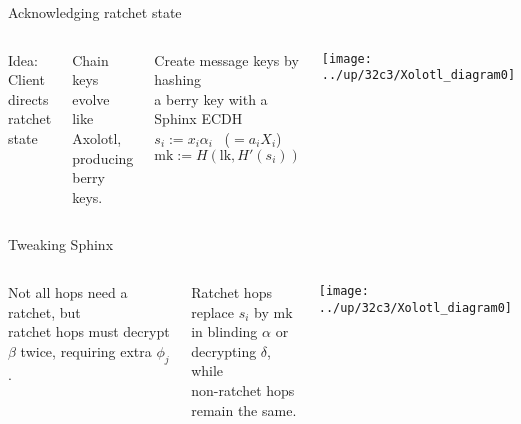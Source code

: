 \documentclass[fleqn,xcolor={usenames,dvipsnames}]{beamer}
\begin{document}
\begin{frame}[t]{Acknowledging ratchet state}
\begin{columns}[T]
Idea: Client directs ratchet state

\bigskip
Chain keys evolve like Axolotl, 
 \hspace*{2pt} producing berry keys. %

\smallskip
Create message keys by hashing \\
 \hspace*{2pt} a berry key with a Sphinx ECDH \\ %
 \hspace*{10pt} $s_i := x_i \alpha_i$ \  ($= a_i X_i$) \\
\smallskip
 \hspace*{10pt} $\textrm{mk} := H(\textrm{lk},H'(s_i))$

\medskip
{}

\texttt{[image: ../up/32c3/Xolotl\_diagram0]}
\end{columns}
\end{frame}


\begin{frame}[t]{Tweaking Sphinx}
\begin{columns}[T]

Not all hops need a ratchet, but \\
 \hspace*{1pt} ratchet hops must decrypt $\beta$ twice,
 \hspace*{1pt} requiring extra $\phi_j$. 



\medskip

Ratchet hops replace $s_i$ by $\textrm{mk}$ \\
 \hspace*{1pt} in blinding $\alpha$ or decrypting $\delta$, while \\
 \hspace*{1pt} non-ratchet hops remain the same.

\texttt{[image: ../up/32c3/Xolotl\_diagram0]}
\end{columns}
\end{frame}
\end{document}

